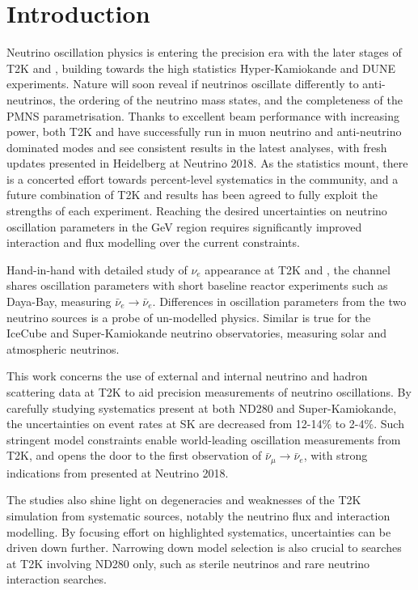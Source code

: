 \chapter{Introduction}
\label{chap:intro}
Neutrino oscillation physics is entering the precision era with the later stages of T2K\cite{t2k_2017} and \nova\cite{nova_2018}, building towards the high statistics Hyper-Kamiokande\cite{hyperk} and DUNE\cite{dune} experiments. Nature will soon reveal if neutrinos oscillate differently to anti-neutrinos, the ordering of the neutrino mass states, and the completeness of the PMNS parametrisation\cite{p1,p2,mns}. Thanks to excellent beam performance with increasing power, both T2K and \nova have successfully run in muon neutrino and anti-neutrino dominated modes and see consistent results in the latest analyses, with fresh updates presented in Heidelberg at Neutrino 2018\cite{t2k_neutrino2018, nova_neutrino2018}. As the statistics mount, there is a concerted effort towards percent-level systematics in the community, and a future combination of T2K and \nova results has been agreed to fully exploit the strengths of each experiment\cite{t2k_nova, t2k_nova_meet}. Reaching the desired uncertainties on neutrino oscillation parameters in the GeV region requires significantly improved interaction and flux modelling over the current constraints\cite{t2k_ii, dune_exp}.

Hand-in-hand with detailed study of $\nu_e$ appearance at T2K and \nova, the channel shares oscillation parameters with short baseline reactor experiments such as Daya-Bay\cite{daya_bay}, measuring $\bar{\nu}_e\rightarrow \bar{\nu}_e$. Differences in oscillation parameters from the two neutrino sources is a probe of un-modelled physics. Similar is true for the IceCube\cite{icecube} and Super-Kamiokande\cite{superk} neutrino observatories, measuring solar and atmospheric neutrinos.

This work concerns the use of external and internal neutrino and hadron scattering data at T2K to aid precision measurements of neutrino oscillations. By carefully studying systematics present at both ND280 and Super-Kamiokande, the uncertainties on event rates at SK are decreased from 12-14\% to 2-4\%. Such stringent model constraints enable world-leading oscillation measurements from T2K\cite{pdg_2017}, and opens the door to the first observation of $\bar{\nu}_\mu \rightarrow \bar{\nu}_e$, with strong indications from \nova presented at Neutrino 2018\cite{nova_neutrino2018}.

The studies also shine light on degeneracies and weaknesses of the T2K simulation from systematic sources, notably the neutrino flux and interaction modelling. By focusing effort on highlighted systematics, uncertainties can be driven down further. Narrowing down model selection is also crucial to searches at T2K involving ND280 only, such as sterile neutrinos and rare neutrino interaction searches.


